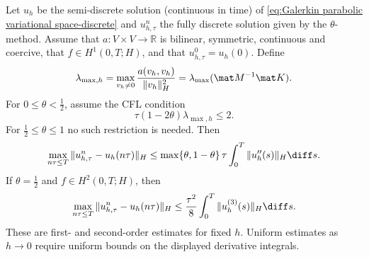 \begin{theorem}
    \label{thm:Galerkin parabolic convergence in tau}
    Let $u_h$ be the semi-discrete solution (continuous in time) of \eqref{eq:Galerkin parabolic variational space-discrete} and $u_{h,\tau}^n$ the fully discrete solution given by the $\theta$-method.
    Assume that $a:V\times V\to\mathbb R$ is bilinear, symmetric, continuous and coercive, that $f\in H^1(0,T;H)$, and that $u_{h,\tau}^0=u_h(0)$. Define
    \begin{equation*}
        \lambda_{\max,h}=\max_{v_h\ne0}\frac{a(v_h,v_h)}{\|v_h\|_H^2}
        =\lambda_{\max}(\mat M^{-1}\mat K).
    \end{equation*}
    For $0\le\theta<\frac12$, assume the CFL condition
    \begin{equation*}
        \tau(1-2\theta)\lambda_{\max,h}\le2.
    \end{equation*}
    For $\frac12\le\theta\le1$ no such restriction is needed. Then
    \begin{equation*}
        \max_{n\tau\le T}\|u_{h,\tau}^n-u_h(n\tau)\|_H
        \le \max\{\theta,1-\theta\}\,\tau\int_0^T\|u_h''(s)\|_H\diff s.
    \end{equation*}
    If $\theta=\frac12$ and $f\in H^2(0,T;H)$, then
    \begin{equation*}
        \max_{n\tau\le T}\|u_{h,\tau}^n-u_h(n\tau)\|_H
        \le \frac{\tau^2}{8}\int_0^T\|u_h^{(3)}(s)\|_H\diff s.
    \end{equation*}
    These are first- and second-order estimates for fixed $h$. Uniform estimates as $h\to0$ require uniform bounds on the displayed derivative integrals.
\end{theorem}
